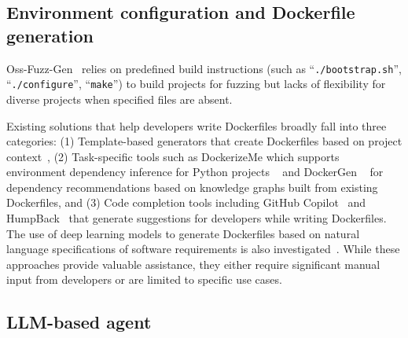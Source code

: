 
\subsection{Environment configuration and Dockerfile generation}




Oss-Fuzz-Gen~\cite{Liu_OSS-Fuzz-Gen_Automated_Fuzz_2024} relies on predefined build instructions (such as ``\texttt{./bootstrap.sh}'', ``\texttt{./configure}'', ``\texttt{make}'') to build projects for fuzzing but lacks of flexibility for diverse projects when specified files are absent.

Existing solutions that help developers write Dockerfiles broadly fall into three categories: (1) Template-based generators that create Dockerfiles based on project context~\cite{starter, generatordocker}, (2) Task-specific tools such as DockerizeMe which supports environment dependency inference for Python projects ~\cite{horton2019dockerizeme} and DockerGen ~\cite{ye2021dockergen} for dependency recommendations based on knowledge graphs built from existing Dockerfiles, and (3) Code completion tools including GitHub Copilot~\cite{copilot} and HumpBack~\cite{hanayama2020humpback} that generate suggestions for developers while writing Dockerfiles. The use of deep learning models to generate Dockerfiles based on natural language specifications of software requirements is also investigated~\cite{rosa2023automatically}. While these approaches provide valuable assistance, they either require significant manual input from developers or are limited to specific use cases.


\subsection{LLM-based agent}



